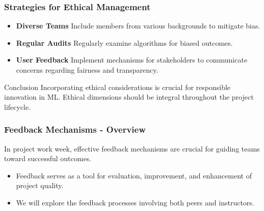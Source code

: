 \documentclass{beamer}
\begin{document}
\begin{frame}[fragile]
    \frametitle{Strategies for Ethical Management}
    \begin{itemize}
        \item \textbf{Diverse Teams}
            Include members from various backgrounds to mitigate bias.
        
        \item \textbf{Regular Audits}
            Regularly examine algorithms for biased outcomes.
        
        \item \textbf{User Feedback}
            Implement mechanisms for stakeholders to communicate concerns regarding fairness and transparency.
    \end{itemize}
    
    \begin{block}{Conclusion}
        Incorporating ethical considerations is crucial for responsible innovation in ML. Ethical dimensions should be integral throughout the project lifecycle.
    \end{block}
\end{frame}

\begin{frame}[fragile]
    \frametitle{Feedback Mechanisms - Overview}
    In project work week, effective feedback mechanisms are crucial for guiding teams toward successful outcomes. 
    \begin{itemize}
        \item Feedback serves as a tool for evaluation, improvement, and enhancement of project quality.
        \item We will explore the feedback processes involving both peers and instructors.
    \end{itemize}
\end{frame}
\end{document}
